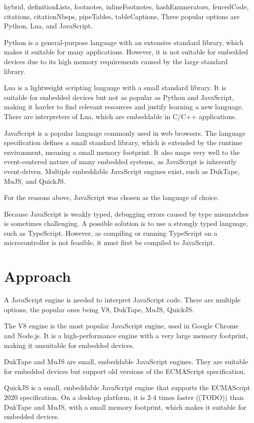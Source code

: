 \documentclass[
  digital,
  oneside,
  nosansbold,
  nocolorbold,
  lof,
  lot
]{fithesis4}
\begin{document}
\begin{markdown*}{%
  hybrid,
  definitionLists,
  footnotes,
  inlineFootnotes,
  hashEnumerators,
  fencedCode,
  citations,
  citationNbsps,
  pipeTables,
  tableCaptions,
}
Three popular options are Python, Lua, and JavaScript.

Python is a general-purpose language with an extensive standard library, which makes it suitable for many applications. However, it is not suitable for embedded devices due to its high memory requirements caused by the large standard library.

Lua is a lightweight scripting language with a small standard library. It is suitable for embedded devices but not as popular as Python and JavaScript, making it harder to find relevant resources and justify learning a new language. There are interpreters of Lua, which are embeddable in C/C++ applications.

JavaScript is a popular language commonly used in web browsers. The language specification defines a small standard library, which is extended by the runtime environment, meaning a small memory footprint. It also maps very well to the event-centered nature of many embedded systems, as JavaScript is inherently event-driven. Multiple embeddable JavaScript engines exist, such as DukTape, MuJS, and QuickJS.

For the reasons above, JavaScript was chosen as the language of choice.

Because JavaScript is weakly typed, debugging errors caused by type mismatches is sometimes challenging. A possible solution is to use a strongly typed language, such as TypeScript. However, as compiling or running TypeScript on a microcontroller is not feasible, it must first be compiled to JavaScript.

\chapter{Approach}

A JavaScript engine is needed to interpret JavaScript code. There are multiple options, the popular ones being V8, DukTape, MuJS, QuickJS.

The V8 engine is the most popular JavaScript engine, used in Google Chrome and Node.js. It is a high-performance engine with a very large memory footprint, making it unsuitable for embedded devices.

DukTape and MuJS are small, embeddable JavaScript engines. They are suitable for embedded devices but support old versions of the ECMAScript specification.

QuickJS is a small, embeddable JavaScript engine that supports the ECMAScript 2020 specification. On a desktop platform, it is 2-4 times faster ((TODO)) than DukTape and MuJS, with a small memory footprint, which makes it suitable for embedded devices.


\end{markdown*}
\end{document}
